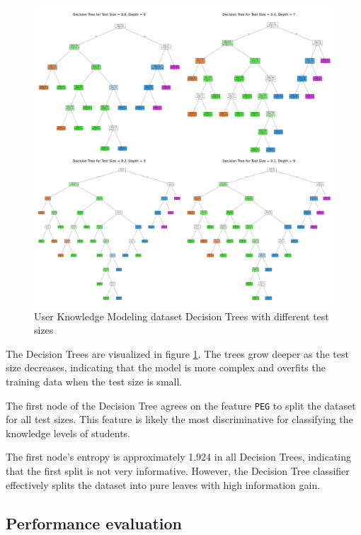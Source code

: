 \begin{figure}[H]
    \centering
    \includegraphics[width=\textwidth]{figures/user_knowledge_modeling_decision_trees.pdf}
    \caption{User Knowledge Modeling dataset Decision Trees with different test sizes}
    \label{fig:user_knowledge_modeling_decision_trees}
\end{figure}

The Decision Trees are visualized in figure \ref{fig:user_knowledge_modeling_decision_trees}. The trees grow deeper as the test size decreases, indicating that the model is more complex and overfits the training data when the test size is small.

The first node of the Decision Tree agrees on the feature \texttt{PEG} to split the dataset for all test sizes. This feature is likely the most discriminative for classifying the knowledge levels of students.

The first node's entropy is approximately 1.924 in all Decision Trees, indicating that the first split is not very informative. However, the Decision Tree classifier effectively splits the dataset into pure leaves with high information gain.

\subsection{Performance evaluation}

